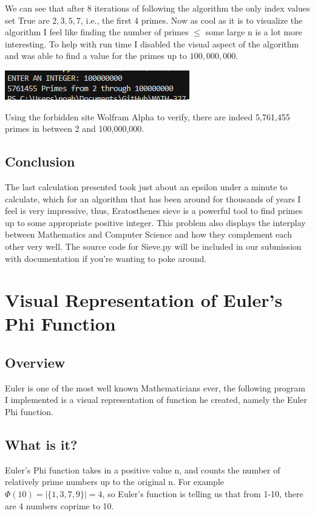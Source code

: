 \documentclass{article}
\begin{document}
We can see that after 8 iterations of following the algorithm the only index values set True are $2,3,5,7$, i.e., the first 4 primes. 
Now as cool as it is to visualize the algorithm I feel like finding the number of primes $\leq$ some large n is a lot more interesting.
To help with run time I disabled the visual aspect of the algorithm and was able to find a value for the primes up to $100,000,000$.
\begin{center}
  \includegraphics[scale=1.0]{primesFound.png}
\end{center}
Using the forbidden site Wolfram Alpha to verify, there are indeed 5,761,455 primes in between 2 and 100,000,000.
\subsection{Conclusion}
The last calculation presented took just about an epsilon under a minute to calculate, which for an algorithm that has been around for thousands of years
I feel is very impressive, thus, Eratosthenes sieve is a powerful tool to find primes up to some appropriate positive integer. This problem also displays the interplay between Mathematics 
and Computer Science and how they complement each other very well. The source code for Sieve.py will be included in our submission with documentation if you're
wanting to poke around.

\newpage
\section{Visual Representation of Euler's Phi Function}
\subsection{Overview}
Euler is one of the most well known Mathematicians ever, the following program I implemented 
is a visual representation of function he created, namely the Euler Phi function.
\subsection{What is it?}
Euler's Phi function takes in a positive value n, and counts the number of relatively prime numbers up to the original n.
For example $\Phi(10)= |\{1,3,7,9\}| = 4$, so Euler's function is telling us that from 1-10, there are 4 numbers coprime to 10.
\end{document}
